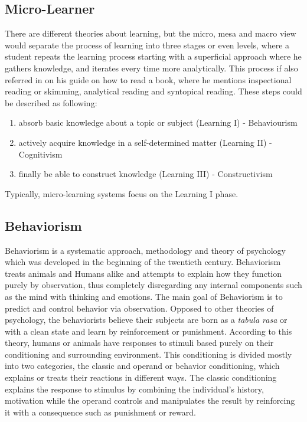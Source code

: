 \subsection{Micro-Learner}

There are different theories about learning, but the micro, mesa and macro view 
would separate the process of learning into three stages or even levels, where a 
student repeats the learning process starting with a superficial approach where 
he gathers knowledge, and iterates every time more analytically. This process 
if also referred in \cite{adler_1970} on his guide on how to read a book, where he
mentions inspectional reading or skimming, analytical reading and syntopical reading.
These steps could be described as following:

\begin{enumerate}
    \item absorb basic knowledge about a topic or subject (Learning I) - Behaviourism
    \item actively acquire knowledge in a self-determined matter (Learning II) 
    - 
    Cognitivism
    \item finally be able to construct knowledge (Learning III) - Constructivism
\end{enumerate}

Typically, micro-learning systems focus on the Learning I phase. 

\subsection{Behaviorism}

Behaviorism is a systematic approach, methodology and theory of psychology which
was developed in the beginning of the twentieth century. Behaviorism treats 
animals and Humans alike and attempts to explain how they function 
purely by observation, thus completely disregarding any internal components such 
as the mind with thinking and emotions. The main goal of Behaviorism is to predict
and control behavior via observation. Opposed to other theories of psychology, the
behaviorists believe their subjects are born as a \textit{tabula rasa} or with a 
clean state and learn by reinforcement or punishment. According to this theory,
humans or animals have responses to stimuli based purely on their conditioning
and surrounding environment. This conditioning is divided mostly into two 
categories, the classic and operand or behavior conditioning, which explains or 
treats their reactions in different ways. The classic conditioning explains the 
response to stimulus by combining the individual's history, motivation while 
the operand controls and manipulates the result by reinforcing it with a 
consequence such as punishment or reward.

